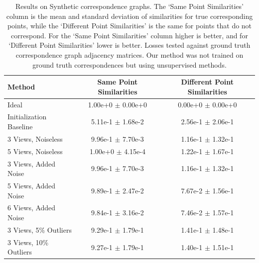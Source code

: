 \documentclass[10pt,twocolumn,letterpaper]{article}
\begin{document}
\begin{table}
\begin{center}
\begin{tabular}{|l|c|c|}
\hline
Method & Same Point Similarities & Different Point Similarities  \\
\hline\hline\hline
Ideal                              & 1.00e+0 $\pm$ 0.00e+0 & 0.00e+0 $\pm$ 0.00e+0 \\ \hline
Initialization Baseline            & 5.11e-1 $\pm$ 1.68e-2 & 2.56e-1 $\pm$ 2.06e-1 \\ \hline
3 Views, Noiseless                 & 9.96e-1 $\pm$ 7.70e-3 & 1.16e-1 $\pm$ 1.32e-1 \\ 
5 Views, Noiseless                 & 1.00e+0 $\pm$ 4.15e-4 & 1.22e-1 $\pm$ 1.67e-1 \\ \hline
3 Views, Added Noise               & 9.96e-1 $\pm$ 7.70e-3 & 1.16e-1 $\pm$ 1.32e-1 \\ 
5 Views, Added Noise               & 9.89e-1 $\pm$ 2.47e-2 & 7.67e-2 $\pm$ 1.56e-1 \\ 
6 Views, Added Noise               & 9.84e-1 $\pm$ 3.16e-2 & 7.46e-2 $\pm$ 1.57e-1 \\ \hline
3 Views, 5\% Outliers              & 9.29e-1 $\pm$ 1.79e-1 & 1.41e-1 $\pm$ 1.48e-1 \\ 
3 Views, 10\% Outliers             & 9.27e-1 $\pm$ 1.79e-1 & 1.40e-1 $\pm$ 1.51e-1 \\ \hline

\hline
\end{tabular}
\end{center}
\caption{
Results on Synthetic correspondence graphs.
The `Same Point Similarities' column is the mean and standard deviation of similarities for true corresponding points, while the `Different Point Similarities' is the same for points that do not correspond.
For the `Same Point Similarities' column higher is better, and for `Different Point Similarities' lower is better.
Losses tested against ground truth correspondence graph adjacency matrices.
Our method was not trained on ground truth correspondences but using unsupervised methods.
}
\label{fig:synthtable}
\end{table}
\end{document}
